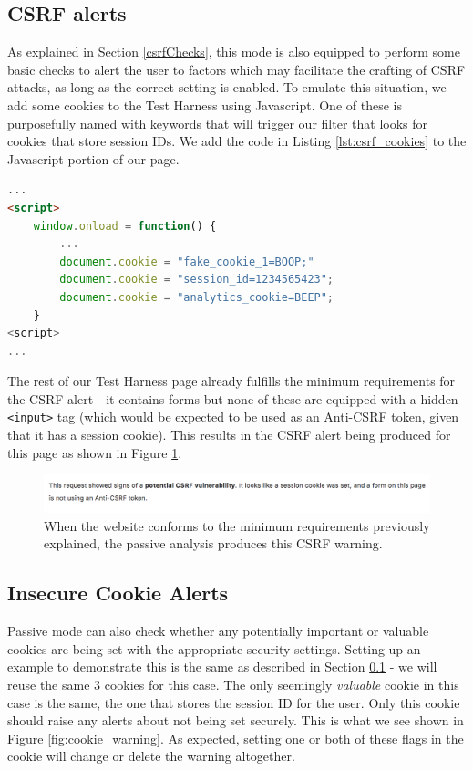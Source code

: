 \subsection{CSRF alerts} \label{applications_CSRF_alerts}

As explained in Section \ref{csrfChecks}, this mode is also equipped to perform some basic checks to alert the user to factors which may facilitate the crafting of CSRF attacks, as long as the correct setting is enabled. To emulate this situation, we add some cookies to the Test Harness using Javascript. One of these is purposefully named with keywords that will trigger our filter that looks for cookies that store session IDs. We add the code in Listing \ref{lst:csrf_cookies} to the Javascript portion of our page.

\begin{lstlisting}[label={lst:csrf_cookies}, language={HTML}, caption={We add some cookies to the page - one of these is designed to trigger our filter to find Session ID related cookies}]
...
<script>
	window.onload = function() {
		...
		document.cookie = "fake_cookie_1=BOOP;"
		document.cookie = "session_id=1234565423";
		document.cookie = "analytics_cookie=BEEP";
	}
<script>
...
\end{lstlisting}

The rest of our Test Harness page already fulfills the minimum requirements for the CSRF alert - it contains forms but none of these are equipped with a hidden \texttt{<input>} tag (which would be expected to be used as an Anti-CSRF token, given that it has a session cookie). This results in the CSRF alert being produced for this page as shown in Figure \ref{fig:csrf_warning}.

\begin{figure}[h!]
	\centering
	\includegraphics[width=\textwidth]{images/csrf_warning.png}
	\caption{When the website conforms to the minimum requirements previously explained, the passive analysis produces this CSRF warning.}
	\label{fig:csrf_warning}
\end{figure}

\subsection{Insecure Cookie Alerts}

Passive mode can also check whether any potentially important or valuable cookies are being set with the appropriate security settings. Setting up an example to demonstrate this is the same as described in Section \ref{applications_CSRF_alerts} - we will reuse the same 3 cookies for this case. The only seemingly \textit{valuable} cookie in this case is the same, the one that stores the session ID for the user. Only this cookie should raise any alerts about not being set securely. This is what we see shown in Figure \ref{fig:cookie_warning}. As expected, setting one or both of these flags in the cookie will change or delete the warning altogether.  \\

